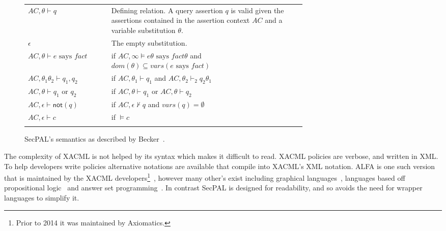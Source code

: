 \documentclass[thesis.tex]{subfiles}
\begin{document}
\begin{figure}\centering
  \begin{tabular}{l p{0.7\linewidth}}
    \toprule
    $AC,\theta \vdash q$                     & Defining relation. A query assertion $q$ is valid given the assertions contained in the assertion context $AC$ and a variable substitution $\theta$. \\
    $\epsilon$                               & The empty substitution.                                                                                                                              \\
    \midrule
    $AC,\theta \vdash e \text{ says } fact$  & if $AC,\infty \models e\theta \text{ says } fact\theta$ and $dom(\theta) \subseteq vars(e \text{ says } fact)$                                       \\
    $AC,\theta_1\theta_2 \vdash q_1, q_2$    & if $AC,\theta_1 \vdash q_1$ and $AC,\theta_2 \vdash_2 q_2\theta_1$                                                                                   \\
    $AC,\theta \vdash q_1 \text{ or } q_2$   & if $AC,\theta \vdash q_1$ or $AC,\theta \vdash q_2$                                                                                                  \\
    $AC,\epsilon \vdash \mathsf{not}(q)$     & if $AC,\epsilon \not\vdash q$ and $vars(q) = \emptyset$                                                                                              \\
    $AC,\epsilon \vdash c$                   & if $\models c$                                                                                                                                       \\
    \bottomrule                             \\
  \end{tabular}
  \caption[SecPAL's semantics.]{SecPAL's semantics as described by Becker~\cite{becker_secpal:_2010}.}
\end{figure}

The complexity of XACML is not helped by its syntax which makes it difficult to read.
XACML policies are verbose, and written in XML.
To help developers write policies alternative notations are available that compile into XACML's XML notation.
ALFA is one such version that is maintained by the XACML developers\footnote{Prior to 2014 it was maintained by Axiomatics.}~\cite{oasis_xacml_technical_comitee_abbreviated_????}, however many other's exist including graphical languages~\cite{henrik_nergaard_scratch-based_2015}, languages based off propositional logic~\cite{zhang_synthesising_2004} and answer set programming~\cite{ramli_xacml_2012}.
In contrast SecPAL is designed for readability, and so avoids the need for wrapper languages to simplify it.
\end{document}

